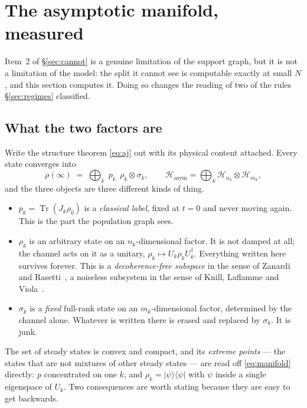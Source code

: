 \documentclass[11pt]{article}
\newcommand{\Tr}{\operatorname{Tr}}
\theoremstyle{plain}
\theoremstyle{definition}
\theoremstyle{remark}
\begin{document}
\section{The asymptotic manifold, measured}
\label{sec:manifold}

Item~2 of \S\ref{sec:cannot} is a genuine limitation of the support graph, but
it is not a limitation of the model: the split it cannot see is computable
exactly at small $N$, and this section computes it. Doing so changes the
reading of two of the rules \S\ref{sec:regimes} classified.

\subsection{What the two factors are}

Write the structure theorem \eqref{eq:aj} out with its physical content
attached. Every state converges into
\begin{equation}
  \rho(\infty) \;=\; \bigoplus_k \; p_k \;\, \rho_k \otimes \sigma_k ,
  \qquad
  \mathcal{H}_{\mathrm{asym}} = \bigoplus_k \mathcal{H}_{n_k} \otimes
  \mathcal{H}_{m_k},
  \label{eq:manifold}
\end{equation}
and the three objects are three different kinds of thing.

\begin{itemize}
\item $p_k = \Tr(J_k \rho_0)$ is a \emph{classical label}, fixed at $t = 0$ and
never moving again. This is the part the population graph sees.
\item $\rho_k$ is an arbitrary state on an $n_k$-dimensional factor. It is not
damped at all; the channel acts on it as a unitary, $\rho_k \mapsto U_k \rho_k
U_k^\dagger$. Everything written here survives forever. This is a
\emph{decoherence-free subspace} in the sense of Zanardi and
Rasetti~\cite{zr1997}, a noiseless subsystem in the sense of Knill, Laflamme
and Viola~\cite{klv2000}.
\item $\sigma_k$ is a \emph{fixed} full-rank state on an $m_k$-dimensional
factor, determined by the channel alone. Whatever is written there is erased
and replaced by $\sigma_k$. It is junk.
\end{itemize}

The set of steady states is convex and compact, and its \emph{extreme points}
--- the states that are not mixtures of other steady states --- are read off
\eqref{eq:manifold} directly: $p$ concentrated on one $k$, and $\rho_k =
|\psi\rangle\langle\psi|$ with $\psi$ inside a single eigenspace of $U_k$. Two
consequences are worth stating because they are easy to get backwards.
\end{document}

